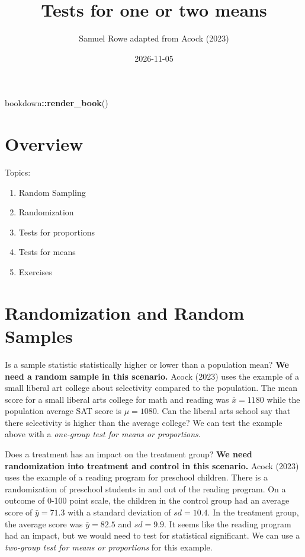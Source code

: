 \documentclass[
]{book}
\title{Tests for one or two means}
\author{Samuel Rowe adapted from Acock (2023)}
\date{2026-11-05}
\newenvironment{Shaded}{\begin{snugshade}}{\end{snugshade}}
\newcommand{\FunctionTok}[1]{\textcolor[rgb]{0.13,0.29,0.53}{\textbf{#1}}}
\newcommand{\NormalTok}[1]{#1}
\newcommand{\SpecialCharTok}[1]{\textcolor[rgb]{0.81,0.36,0.00}{\textbf{#1}}}
\providecommand{\tightlist}{%
  \setlength{\itemsep}{0pt}\setlength{\parskip}{0pt}}
\begin{document}
\maketitle

{
\setcounter{tocdepth}{1}
\tableofcontents
}
\begin{Shaded}
\begin{Highlighting}[]
\NormalTok{bookdown}\SpecialCharTok{::}\FunctionTok{render\_book}\NormalTok{()}
\end{Highlighting}
\end{Shaded}

\chapter*{Overview}\label{overview}

Topics:

\begin{enumerate}
\def\labelenumi{\arabic{enumi}.}
\tightlist
\item
  Random Sampling
\item
  Randomization
\item
  Tests for proportions
\item
  Tests for means
\item
  Exercises
\end{enumerate}

\chapter{Randomization and Random Samples}\label{randomization-and-random-samples}

Is a sample statistic statistically higher or lower than a population mean? \textbf{We need a random sample in this scenario.} Acock (2023) uses the example of a small liberal art college about selectivity compared to the population. The mean score for a small liberal arts college for math and reading was \(\bar{x}=1180\) while the population average SAT score is \(\mu=1080\). Can the liberal arts school say that there selectivity is higher than the average college? We can test the example above with a \emph{one-group test for means or proportions}.

Does a treatment has an impact on the treatment group? \textbf{We need randomization into treatment and control in this scenario.} Acock (2023) uses the example of a reading program for preschool children. There is a randomization of preschool students in and out of the reading program. On a outcome of 0-100 point scale, the children in the control group had an average score of \(\bar{y}=71.3\) with a standard deviation of \(sd=10.4\). In the treatment group, the average score was \(\bar{y}=82.5\) and \(sd=9.9\). It seems like the reading program had an impact, but we would need to test for statistical significant. We can use a \emph{two-group test for means or proportions} for this example.
\end{document}
